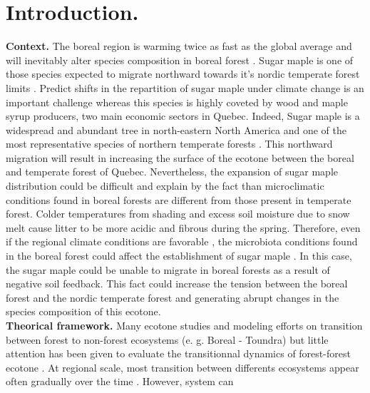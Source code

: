 


\newpage
\setcounter{page}{1}

\section{Introduction.}

\textbf{Context.}  The boreal region is warming twice as fast as the global
average and will inevitably alter species composition in boreal forest
\cite{Scheffer2012,Hughes2000}.  Sugar maple is one of those species expected
to migrate northward towards it's nordic temperate forest limits
\cite{McKENNEY2007,Goldblum2005}. Predict shifts in the repartition of sugar
maple under climate change is an important challenge whereas this species is
highly coveted by wood and maple syrup producers, two main economic sectors in
Quebec. Indeed, Sugar maple is a widespread and abundant tree in north-eastern
North America and one of the most representative species of northern temperate
forests \cite{Graignic2013,Messaoud2007,Kellman2004}. This northward migration
will result in increasing the surface of the ecotone between the boreal and
temperate forest of Quebec. Nevertheless, the expansion of sugar maple
distribution could be difficult and explain by the fact than microclimatic
conditions found in boreal forests are different from those present in
temperate forest. Colder temperatures from shading and excess soil moisture
due to snow melt cause litter to be more acidic and fibrous during the spring.
Therefore, even if the regional climate conditions are favorable
\cite{Kellman2004}, the microbiota conditions found in the boreal forest could
affect the establishment of sugar maple
\cite{Kellman2004,Moore2008,DeFrenne2013}. In this case, the sugar maple could
be unable to migrate in boreal forests as a result of negative soil feedback.
This fact could increase the tension between the boreal forest and the nordic
temperate forest and generating abrupt changes in the species composition of
this ecotone.\\

\textbf{Theorical framework.}  Many ecotone studies and modeling efforts on
transition between forest to non-forest ecosystems (e. g. Boreal - Toundra)
\cite{Scheffer2012,Scheffer2001,Hirota2011} but little attention has been
given to evaluate the transitionnal dynamics of forest-forest ecotone
\cite{Goldblum2010,Graignic2013}. At regional scale, most transition between
differents ecosystems appear often gradually over the time
\cite{Scheffer2001,scheffer2009critical}. However, system can \\

